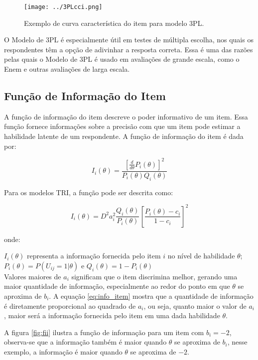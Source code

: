 \begin{figure}[H]
	\centering
	\texttt{[image: ../3PLcci.png]}
	\caption{Exemplo de curva característica do item para modelo 3PL.}
	\label{fig:3PL}
\end{figure}

O Modelo de 3PL é especialmente útil em testes de múltipla escolha, nos quais os respondentes têm a opção de adivinhar a resposta correta. Essa é uma das razões pelas quais o Modelo de 3PL é usado em avaliações de grande escala, como o Enem \cite{inep2021} e outras avaliações de larga escala. 

\subsection{Função de Informação do Item}

A função de informação do item descreve o poder informativo de um item. Essa função fornece informações sobre a precisão com que um item pode estimar a habilidade latente de um respondente. \cite{de2000teoria} 
A função de informação do item é dada por:

\[
		I_i(\theta) = \dfrac{[\frac{d}{d\theta}P_i(\theta)]^2}{P_i(\theta)Q_i(\theta)}
\]

Para os modelos TRI, a função pode ser descrita como:

\begin{equation}\label{eq:info_item}
	I_i(\theta) = D^2 a_i^2\frac{Q_i(\theta)}{P_i(\theta)} \left[\frac{P_i(\theta) - c_i}{1 - c_i}\right]^2
\end{equation}

onde:

\noindent $I_i(\theta) $ representa a informação fornecida pelo item $i$ no nível de habilidade $\theta$;\\

\noindent $P_i(\theta) = P(U_{ij} = 1| \theta) $ e $ Q_i(\theta) = 1 - P_i(\theta) $ \\

Valores maiores de $a_i$ significam que o item discrimina melhor, gerando uma maior quantidade de informação, especialmente ao redor do ponto em que $\theta$ se aproxima de $b_i$. A equação \ref{eq:info_item} mostra que a quantidade de informação é diretamente proporcional ao quadrado de $a_i$, ou seja, quanto maior o valor de $a_i$, maior será a informação fornecida pelo item em uma dada habilidade $\theta$.

A figura \ref{fig:fii} ilustra a função de informação para um item com $b_i = -2$, observa-se que a informação também é maior quando $\theta$ se aproxima de $b_i$, nesse exemplo, a informação é maior quando $\theta$ se aproxima de $-2$.

